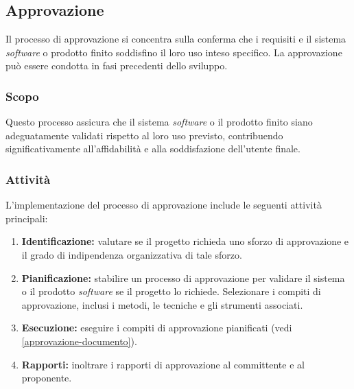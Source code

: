 \subsection{Approvazione}
\label{subsec:approvazione}

Il processo di approvazione si concentra sulla conferma che i requisiti e il
sistema \textit{software} o prodotto finito soddisfino il loro uso inteso
specifico. La approvazione può essere condotta in fasi precedenti dello sviluppo.

\subsubsection{Scopo}

Questo processo assicura che il sistema \textit{software} o il prodotto finito
siano adeguatamente validati rispetto al loro uso previsto, contribuendo
significativamente all'affidabilità e alla soddisfazione dell'utente finale.

\subsubsection{Attività}
L'implementazione del processo di approvazione include le seguenti attività
principali:

\begin{enumerate}
	\item \textbf{Identificazione:} valutare se il progetto richieda uno sforzo
	      di approvazione e il grado di indipendenza organizzativa di tale
	      sforzo.
	\item \textbf{Pianificazione:} stabilire un processo di approvazione per
	      validare il sistema o il prodotto \textit{software} se il progetto lo
	      richiede. Selezionare i compiti di approvazione, inclusi i metodi, le
	      tecniche e gli strumenti associati.
	\item \textbf{Esecuzione:} eseguire i compiti di approvazione pianificati
	      (vedi \autoref{approvazione-documento}).
	\item \textbf{Rapporti:} inoltrare i rapporti di approvazione al committente
	      e al proponente.
\end{enumerate}
